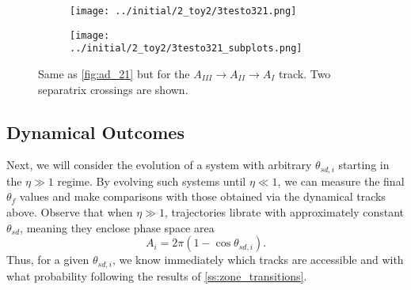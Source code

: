 \documentclass[
        fleqn,
        usenatbib,
    ]{mnras}
\newcommand*{\p}[1]{\left(#1\right)}
\begin{document}
\begin{figure}
    \centering
    \begin{subfigure}{\columnwidth}
        \centering
        \texttt{[image: ../initial/2\_toy2/3testo321.png]}
    \end{subfigure}
    \begin{subfigure}{\columnwidth}
        \centering
        \texttt{[image: ../initial/2\_toy2/3testo321\_subplots.png]}
    \end{subfigure}
    \caption{Same as \autoref{fig:ad_21} but for the $A_{III} \to A_{II} \to A_I$
    track. Two separatrix crossings are shown.}\label{fig:ad_321}
\end{figure}

\subsection{Dynamical Outcomes}\label{ss:ad_ensemble}

Next, we will consider the evolution of a system with arbitrary $\theta_{sd, i}$
starting in the $\eta \gg 1$ regime. By evolving such systems until $\eta \ll
1$, we can measure the final $\theta_f$ values and make comparisons with those
obtained via the dynamical tracks above. Observe that when $\eta \gg 1$,
trajectories librate with approximately constant $\theta_{sd}$, meaning they
enclose phase space area
\begin{equation}
    A_i = 2\pi\p{1 - \cos \theta_{sd, i}}.\label{eq:ai_qsd}
\end{equation}
Thus, for a given $\theta_{sd, i}$, we know immediately which tracks are
accessible and with what probability following the results of
\autoref{ss:zone_transitions}.
\end{document}
